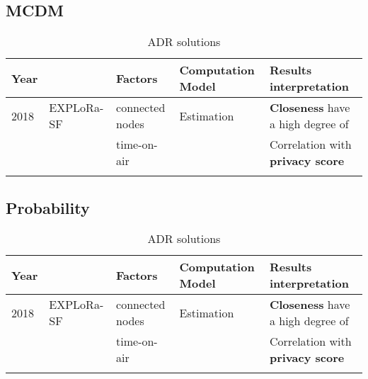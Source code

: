 \subsection{MCDM}
\begin{longtable}{lllll}
	Year  & \                                              & \textbf{Factors}           & \textbf{Computation Model}             & \textbf{Results interpretation}                               \\\hline
	2018  & EXPLoRa-SF \cite{cuomo_explora_2017}           & connected nodes            & Estimation                             & \textbf{Closeness} have a high degree of                      \\
	\     &                                                & time-on-air                &                                        & Correlation with \textbf{privacy score}                       \\\hline

\caption{ADR solutions}
\end{longtable}


\subsection{Probability}
\begin{longtable}{lllll}
	Year  & \                                              & \textbf{Factors}           & \textbf{Computation Model}             & \textbf{Results interpretation}                               \\\hline
	2018  & EXPLoRa-SF \cite{cuomo_explora_2017}           & connected nodes            & Estimation                             & \textbf{Closeness} have a high degree of                      \\
	\     &                                                & time-on-air                &                                        & Correlation with \textbf{privacy score}                       \\\hline

\caption{ADR solutions}
\end{longtable}


